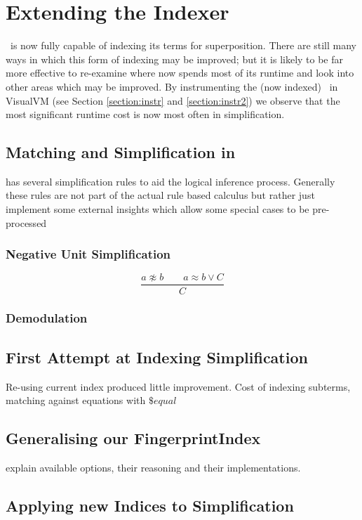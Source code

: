 \section{Extending the Indexer}

\Beagle\ is now fully capable of indexing its terms for superposition. There
are still many ways in which this form of indexing may be improved; but it is likely
to be far more effective to re-examine where \beagle now spends most of its runtime
and look into other areas which may be improved. By instrumenting the (now indexed)
\beagle\ in VisualVM (see Section \ref{section:instr} and \ref{section:instr2})
we observe that the most significant runtime cost is now most often in simplification.

\subsection{Matching and Simplification in \Beagle}
\Beagle has several simplification rules to aid the logical inference process.
Generally these rules are not part of the actual rule based calculus but rather
just implement some external insights which allow some special cases to be
pre-processed

\subsubsection{Negative Unit Simplification}

\[ \frac{a\not\approx b \quad \quad a \approx b  \lor C}{C} \]

\subsubsection{Demodulation}


\subsection{First Attempt at Indexing Simplification}
Re-using current index produced little improvement. Cost of indexing
subterms, matching against equations with $\$equal$

\subsection{Generalising our FingerprintIndex}

explain available options, their reasoning and their implementations.

\subsection{Applying new Indices to Simplification}


